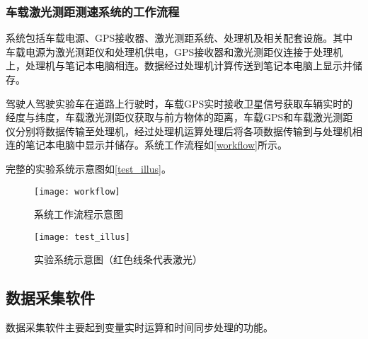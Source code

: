 \subsubsection{车载激光测距测速系统的工作流程}


系统包括车载电源、GPS接收器、激光测距系统、处理机及相关配套设施。其中车载电源为激光测距仪和处理机供电，GPS接收器和激光测距仪连接于处理机上，处理机与笔记本电脑相连。数据经过处理机计算传送到笔记本电脑上显示并储存。

驾驶人驾驶实验车在道路上行驶时，车载GPS实时接收卫星信号获取车辆实时的经度与纬度，车载激光测距仪获取与前方物体的距离，车载GPS和车载激光测距仪分别将数据传输至处理机，经过处理机运算处理后将各项数据传输到与处理机相连的笔记本电脑中显示并储存。系统工作流程如\autoref{workflow}所示。

完整的实验系统示意图如\autoref{test_illus}。

\begin{figure}[htpb]
	\centering
	\texttt{[image: workflow]}
	\caption{系统工作流程示意图}
	\label{workflow}
\end{figure}

\begin{figure}[htpb]
	\centering
	\texttt{[image: test\_illus]}
	\caption{实验系统示意图（红色线条代表激光）}
	\label{test_illus}
\end{figure}


\subsection{数据采集软件}

数据采集软件主要起到变量实时运算和时间同步处理的功能。

